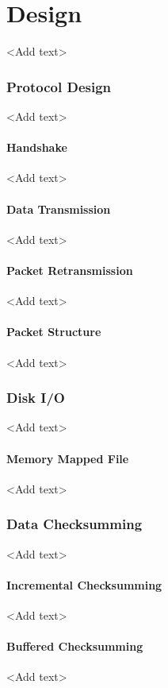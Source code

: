 \chapter{Design}

<Add text>

\subsection{Protocol Design}

<Add text>

\subsubsection{Handshake}

<Add text>

\subsubsection{Data Transmission}

<Add text>

\subsubsection{Packet Retransmission}

<Add text>

\subsubsection{Packet Structure}

<Add text>

\subsection{Disk I/O}

<Add text>

\subsubsection{Memory Mapped File}

<Add text>

\subsection{Data Checksumming}

<Add text>

\subsubsection{Incremental Checksumming}

<Add text>

\subsubsection{Buffered Checksumming}

<Add text>